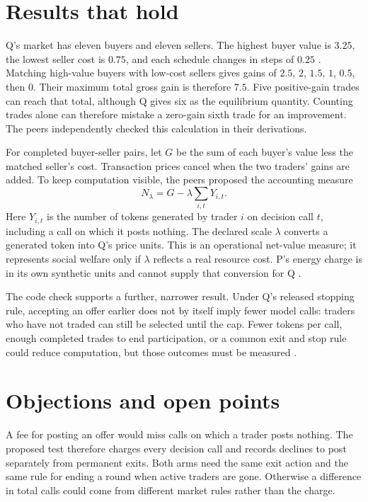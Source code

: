 \documentclass{article}
\begin{document}
\section{Results that hold}

Q's market has eleven buyers and eleven sellers. The highest buyer value is \(3.25\), the lowest seller
cost is \(0.75\), and each schedule changes in steps of \(0.25\) \cite{q}. Matching high-value buyers
with low-cost sellers gives gains of \(2.5\), \(2\), \(1.5\), \(1\), \(0.5\), then \(0\). Their maximum
total gross gain is therefore \(7.5\). Five positive-gain trades can reach that total, although Q gives
six as the equilibrium quantity. Counting trades alone can therefore mistake a zero-gain sixth trade for
an improvement. The peers independently checked this calculation in their derivations.

For completed buyer-seller pairs, let \(G\) be the sum of each buyer's value less the matched seller's
cost. Transaction prices cancel when the two traders' gains are added. To keep computation visible, the
peers proposed the accounting measure
\[
N_{\lambda}=G-\lambda\sum_{i,t}Y_{i,t}.
\]
Here \(Y_{i,t}\) is the number of tokens generated by trader \(i\) on decision call \(t\), including a
call on which it posts nothing. The declared scale \(\lambda\) converts a generated token into Q's price
units. This is an operational net-value measure; it represents social welfare only if \(\lambda\)
reflects a real resource cost. P's energy charge is in its own synthetic units and cannot supply that
conversion for Q \cite{p}.

The code check supports a further, narrower result. Under Q's released stopping rule, accepting an offer
earlier does not by itself imply fewer model calls: traders who have not traded can still be selected
until the cap. Fewer tokens per call, enough completed trades to end participation, or a common exit and
stop rule could reduce computation, but those outcomes must be measured \cite{qcode}.

\section{Objections and open points}

A fee for posting an offer would miss calls on which a trader posts nothing. The proposed test therefore
charges every decision call and records declines to post separately from permanent exits. Both arms need
the same exit action and the same rule for ending a round when active traders are gone. Otherwise a
difference in total calls could come from different market rules rather than the charge.
\end{document}
